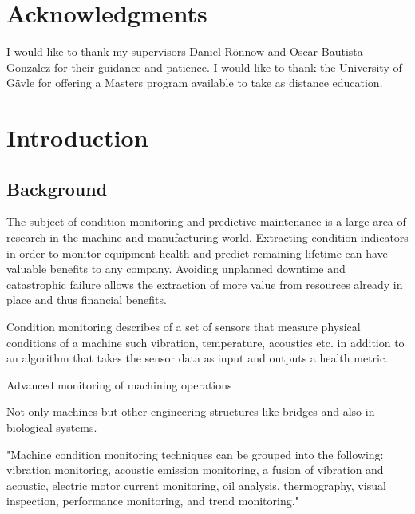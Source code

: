 \documentclass{article}
\begin{document}
\section{Acknowledgments}
I would like to thank my supervisors Daniel Rönnow and Oscar Bautista Gonzalez for their guidance and patience.
I would like to thank the University of Gävle for offering a Masters program available to take as distance education.
\newpage

\pagestyle{plain}

\section{Introduction}
\subsection{Background}
The subject of condition monitoring and predictive maintenance is a large area of research in the machine and manufacturing world. Extracting condition indicators in order to monitor equipment health and predict remaining lifetime can have valuable benefits to any company. Avoiding unplanned downtime and catastrophic failure allows the extraction of more value from resources already in place and thus financial benefits.

Condition monitoring describes of a set of sensors that measure physical conditions of a machine such vibration, temperature, acoustics etc. in addition to an algorithm that takes the sensor data as input and outputs a health metric.

Advanced monitoring of machining operations~\cite{teti2010advanced}

Not only machines but other engineering structures like bridges and also in biological systems.

"Machine condition monitoring techniques can be grouped into the following: vibration monitoring, acoustic emission monitoring, a fusion of vibration and acoustic, electric motor current monitoring, oil analysis, thermography, visual inspection, performance monitoring, and trend monitoring."
\end{document}
